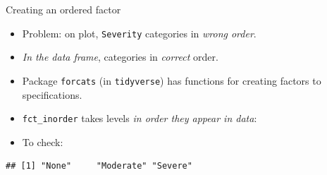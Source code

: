 \documentclass[
  ignorenonframetext,
]{beamer}
\newenvironment{Shaded}{\begin{snugshade}}{\end{snugshade}}
\newcommand{\DataTypeTok}[1]{\textcolor[rgb]{0.13,0.29,0.53}{#1}}
\newcommand{\KeywordTok}[1]{\textcolor[rgb]{0.13,0.29,0.53}{\textbf{#1}}}
\newcommand{\NormalTok}[1]{#1}
\newcommand{\OperatorTok}[1]{\textcolor[rgb]{0.81,0.36,0.00}{\textbf{#1}}}
\newcommand{\StringTok}[1]{\textcolor[rgb]{0.31,0.60,0.02}{#1}}
\providecommand{\tightlist}{%
  \setlength{\itemsep}{0pt}\setlength{\parskip}{0pt}}
\begin{document}
\begin{frame}[fragile]{Creating an ordered factor}
\protect\hypertarget{creating-an-ordered-factor}{}

\begin{itemize}
\item
  Problem: on plot, \texttt{Severity} categories in \emph{wrong
  order}.
\item
  \emph{In the data frame}, categories in \emph{correct} order.
\item
  Package \texttt{forcats} (in \texttt{tidyverse}) has functions for
  creating factors to specifications.
\item
  \texttt{fct\_inorder} takes levels \emph{in order they appear in
  data}:
\end{itemize}

\begin{Shaded}
\end{Shaded}

\begin{itemize}
\tightlist
\item
  To check:
\end{itemize}

\begin{Shaded}
\end{Shaded}

\begin{verbatim}
## [1] "None"     "Moderate" "Severe"
\end{verbatim}

\end{frame}
\end{document}
